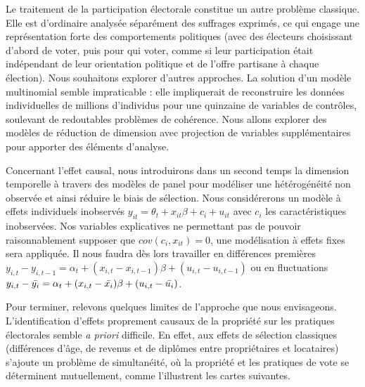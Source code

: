 \documentclass[a4paper,14pt]{article}
\begin{document}
\begin{multicols}{2}
Le traitement de la participation électorale constitue un autre problème classique. Elle est d'ordinaire analysée séparément des suffrages exprimés, ce qui engage une représentation forte des comportements politiques (avec des électeurs choisissant d'abord de voter, puis pour qui voter, comme si leur participation était indépendant de leur orientation politique et de l'offre partisane à chaque élection). Nous souhaitons explorer d'autres approches. La solution d'un modèle multinomial semble impraticable : elle impliquerait de reconstruire les données individuelles de millions d'individus pour une quinzaine de variables de contrôles, soulevant de redoutables problèmes de cohérence. Nous allons explorer des modèles de réduction de dimension avec projection de variables supplémentaires pour apporter des éléments d'analyse.


Concernant l'effet causal, nous introduirons dans un second temps la dimension temporelle à travers des modèles de panel pour modéliser une hétérogénéité non observée et ainsi réduire le biais de sélection. Nous considérerons un modèle à effets individuels inobservés $y_{it} = \theta_{t} + x_{it}\beta + c_{i}  + u_{it}$ avec $c_{i}$ les caractéristiques inobservées. Nos variables explicatives ne permettant pas de pouvoir raisonnablement supposer que $cov(c_{i}, x_{it}) = 0$, une modélisation à effets fixes sera appliquée. Il nous faudra dès lors travailler en différences premières $y_{i,t} - y_{i,t-1} = \alpha_{t} + (x_{i,t} - x_{i,t-1})\beta + (u_{i,t} - u_{i,t-1})$ ou en fluctuations 
$y_{i,t} - \Bar{y_{i}} = \alpha_{t} + (x_{i,t} - \Bar{x_{i}})\beta + (u_{i,t} - \Bar{u_{i}})$.

Pour terminer, relevons quelques limites de l'approche que nous envisageons. L'identification d'effets proprement causaux de la propriété sur les pratiques électorales semble \textit{a priori} difficile. En effet, aux effets de sélection classiques (différences d'âge, de revenus et de diplômes entre propriétaires et locataires) s'ajoute un problème de simultanéité, où la propriété et les pratiques de vote se déterminent mutuellement, comme l'illustrent les cartes suivantes.
\end{multicols}
\end{document}
